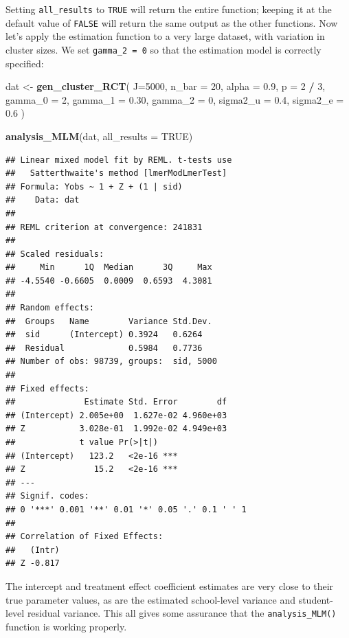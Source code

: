 \documentclass[
]{book}
\newenvironment{Shaded}{\begin{snugshade}}{\end{snugshade}}
\newcommand{\AttributeTok}[1]{\textcolor[rgb]{0.13,0.29,0.53}{#1}}
\newcommand{\ConstantTok}[1]{\textcolor[rgb]{0.56,0.35,0.01}{#1}}
\newcommand{\DecValTok}[1]{\textcolor[rgb]{0.00,0.00,0.81}{#1}}
\newcommand{\FloatTok}[1]{\textcolor[rgb]{0.00,0.00,0.81}{#1}}
\newcommand{\FunctionTok}[1]{\textcolor[rgb]{0.13,0.29,0.53}{\textbf{#1}}}
\newcommand{\NormalTok}[1]{#1}
\newcommand{\OtherTok}[1]{\textcolor[rgb]{0.56,0.35,0.01}{#1}}
\newcommand{\SpecialCharTok}[1]{\textcolor[rgb]{0.81,0.36,0.00}{\textbf{#1}}}
\begin{document}
Setting \texttt{all\_results} to \texttt{TRUE} will return the entire function; keeping it at the default value of \texttt{FALSE} will return the same output as the other functions.
Now let's apply the estimation function to a very large dataset, with variation in cluster sizes.
We set \texttt{gamma\_2\ =\ 0} so that the estimation model is correctly specified:

\begin{Shaded}
\begin{Highlighting}[]
\NormalTok{dat }\OtherTok{\textless{}{-}} \FunctionTok{gen\_cluster\_RCT}\NormalTok{( }
  \AttributeTok{J=}\DecValTok{5000}\NormalTok{, }\AttributeTok{n\_bar =} \DecValTok{20}\NormalTok{, }\AttributeTok{alpha =} \FloatTok{0.9}\NormalTok{, }\AttributeTok{p =} \DecValTok{2} \SpecialCharTok{/} \DecValTok{3}\NormalTok{, }
  \AttributeTok{gamma\_0 =} \DecValTok{2}\NormalTok{, }\AttributeTok{gamma\_1 =} \FloatTok{0.30}\NormalTok{, }\AttributeTok{gamma\_2 =} \DecValTok{0}\NormalTok{,}
  \AttributeTok{sigma2\_u =} \FloatTok{0.4}\NormalTok{, }\AttributeTok{sigma2\_e =} \FloatTok{0.6}
\NormalTok{)}

\FunctionTok{analysis\_MLM}\NormalTok{(dat, }\AttributeTok{all\_results =} \ConstantTok{TRUE}\NormalTok{)}
\end{Highlighting}
\end{Shaded}

\begin{verbatim}
## Linear mixed model fit by REML. t-tests use
##   Satterthwaite's method [lmerModLmerTest]
## Formula: Yobs ~ 1 + Z + (1 | sid)
##    Data: dat
## 
## REML criterion at convergence: 241831
## 
## Scaled residuals: 
##     Min      1Q  Median      3Q     Max 
## -4.5540 -0.6605  0.0009  0.6593  4.3081 
## 
## Random effects:
##  Groups   Name        Variance Std.Dev.
##  sid      (Intercept) 0.3924   0.6264  
##  Residual             0.5984   0.7736  
## Number of obs: 98739, groups:  sid, 5000
## 
## Fixed effects:
##              Estimate Std. Error        df
## (Intercept) 2.005e+00  1.627e-02 4.960e+03
## Z           3.028e-01  1.992e-02 4.949e+03
##             t value Pr(>|t|)    
## (Intercept)   123.2   <2e-16 ***
## Z              15.2   <2e-16 ***
## ---
## Signif. codes:  
## 0 '***' 0.001 '**' 0.01 '*' 0.05 '.' 0.1 ' ' 1
## 
## Correlation of Fixed Effects:
##   (Intr)
## Z -0.817
\end{verbatim}

The intercept and treatment effect coefficient estimates are very close to their true parameter values, as are the estimated school-level variance and student-level residual variance.
This all gives some assurance that the \texttt{analysis\_MLM()} function is working properly.
\end{document}
